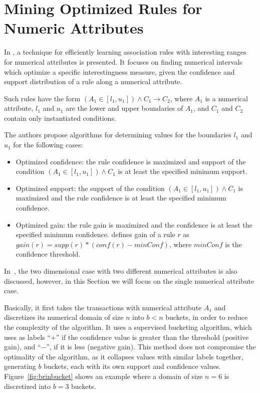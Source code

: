\section{Mining Optimized Rules for Numeric Attributes}
\label{sec:rw-miningOptimizedRules}

In \citet{Brin99miningoptimized}, a technique for efficiently learning association rules with interesting ranges for
numerical attributes is presented. It focuses on finding numerical intervals which optimize a specific interestingness
measure, given the confidence and support distribution of a rule along a numerical attribute. 

Such rules have the form $(A_1 \in [l_1,u_1]) \wedge C_1 \rightarrow C_2$, where
$A_1$ is a numerical attribute, $l_1$ and $u_1$ are the lower and upper boundaries of $A_1$, and $C_1$ and $C_2$
contain
only instantiated conditions.

The authors propose algorithms for determining values for the boundaries $l_1$ and $u_1$ for the following cases:

\begin{itemize}
 \item Optimized confidence: the rule confidence is maximized and  support of the condition $(A_1 \in [l_1,u_1])
\wedge
C_1$ is at least the specified minimum support.
  \item Optimized support: the support of the condition $(A_1 \in [l_1,u_1]) \wedge C_1$ is maximized and the rule
confidence is at least the specified minimum confidence.
  \item Optimized gain: the rule gain is maximized and the confidence is at least the specified minimum confidence.
\citet{Brin99miningoptimized} defines gain of a rule $r$ as $gain(r)= supp(r)*(conf(r)-minConf)$, where $minConf$ is the
confidence threshold.
\end{itemize}

In~\citet{Brin99miningoptimized}, the two dimensional case with two different numerical attributes is also discussed,
however, in this Section we will focus on the single numerical attribute case.

Basically, it first takes the transactions with numerical attribute $A_1$ and discretizes its numerical domain of size
$n$ into $b < n$ buckets, in order to reduce the complexity of the algorithm. It uses a supervised bucketing algorithm,
which uses as labels ``$+$'' if the confidence value is greater than the threshold (positive gain), and ``$-$'', if it
is less (negative gain). This method does not compromise the optimality of the algorithm, as it collapses values with
similar labels together, generating $b$ buckets, each with its own support and confidence values.
Figure~\ref{fig:brinbucket} shows an example where a domain of size $n=6$ is discretized into $b=3$ buckets.

